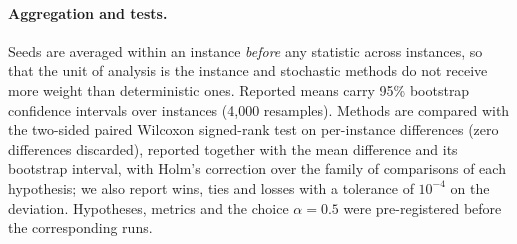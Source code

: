 \paragraph{Aggregation and tests.} Seeds are averaged within an instance \emph{before} any
statistic across instances, so that the unit of analysis is the instance and stochastic methods
do not receive more weight than deterministic ones. Reported means carry 95\% bootstrap
confidence intervals over instances (4{,}000 resamples). Methods are compared with the two-sided paired
Wilcoxon signed-rank test on per-instance differences (zero differences discarded), reported
together with the mean difference and its bootstrap interval, with Holm's correction over the family of
comparisons of each hypothesis; we also report wins, ties and losses with a tolerance of
$10^{-4}$ on the deviation. Hypotheses, metrics and the choice $\alpha=0.5$ were pre-registered
before the corresponding runs.
